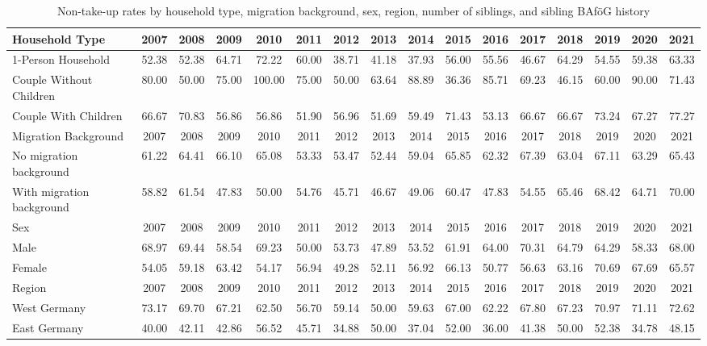\begin{landscape}
\begin{table}[htbp]
\centering
\caption{Non-take-up rates by household type, migration background, sex, region, number of siblings, and sibling BAföG history}
\label{tab:nontakeup_hgtyp_migback_sex_east_siblings}
\begin{tabular}{lccccccccccccccc}
\toprule
Household Type & 2007 & 2008 & 2009 & 2010 & 2011 & 2012 & 2013 & 2014 & 2015 & 2016 & 2017 & 2018 & 2019 & 2020 & 2021 \\
\midrule
1-Person Household      & 52.38 & 52.38 & 64.71 & 72.22 & 60.00 & 38.71 & 41.18 & 37.93 & 56.00 & 55.56 & 46.67 & 64.29 & 54.55 & 59.38 & 63.33 \\
Couple Without Children & 80.00 & 50.00 & 75.00 & 100.00 & 75.00 & 50.00 & 63.64 & 88.89 & 36.36 & 85.71 & 69.23 & 46.15 & 60.00 & 90.00 & 71.43 \\
Couple With Children    & 66.67 & 70.83 & 56.86 & 56.86 & 51.90 & 56.96 & 51.69 & 59.49 & 71.43 & 53.13 & 66.67 & 66.67 & 73.24 & 67.27 & 77.27 \\
\midrule
Migration Background & 2007 & 2008 & 2009 & 2010 & 2011 & 2012 & 2013 & 2014 & 2015 & 2016 & 2017 & 2018 & 2019 & 2020 & 2021 \\
\midrule
No migration background   & 61.22 & 64.41 & 66.10 & 65.08 & 53.33 & 53.47 & 52.44 & 59.04 & 65.85 & 62.32 & 67.39 & 63.04 & 67.11 & 63.29 & 65.43 \\
With migration background & 58.82 & 61.54 & 47.83 & 50.00 & 54.76 & 45.71 & 46.67 & 49.06 & 60.47 & 47.83 & 54.55 & 65.46 & 68.42 & 64.71 & 70.00 \\
\midrule
Sex & 2007 & 2008 & 2009 & 2010 & 2011 & 2012 & 2013 & 2014 & 2015 & 2016 & 2017 & 2018 & 2019 & 2020 & 2021 \\
\midrule
Male   & 68.97 & 69.44 & 58.54 & 69.23 & 50.00 & 53.73 & 47.89 & 53.52 & 61.91 & 64.00 & 70.31 & 64.79 & 64.29 & 58.33 & 68.00 \\
Female & 54.05 & 59.18 & 63.42 & 54.17 & 56.94 & 49.28 & 52.11 & 56.92 & 66.13 & 50.77 & 56.63 & 63.16 & 70.69 & 67.69 & 65.57 \\
\midrule
Region & 2007 & 2008 & 2009 & 2010 & 2011 & 2012 & 2013 & 2014 & 2015 & 2016 & 2017 & 2018 & 2019 & 2020 & 2021 \\
\midrule
West Germany & 73.17 & 69.70 & 67.21 & 62.50 & 56.70 & 59.14 & 50.00 & 59.63 & 67.00 & 62.22 & 67.80 & 67.23 & 70.97 & 71.11 & 72.62 \\
East Germany & 40.00 & 42.11 & 42.86 & 56.52 & 45.71 & 34.88 & 50.00 & 37.04 & 52.00 & 36.00 & 41.38 & 50.00 & 52.38 & 34.78 & 48.15 \\

\end{tabular}
\end{table}
\end{landscape}
